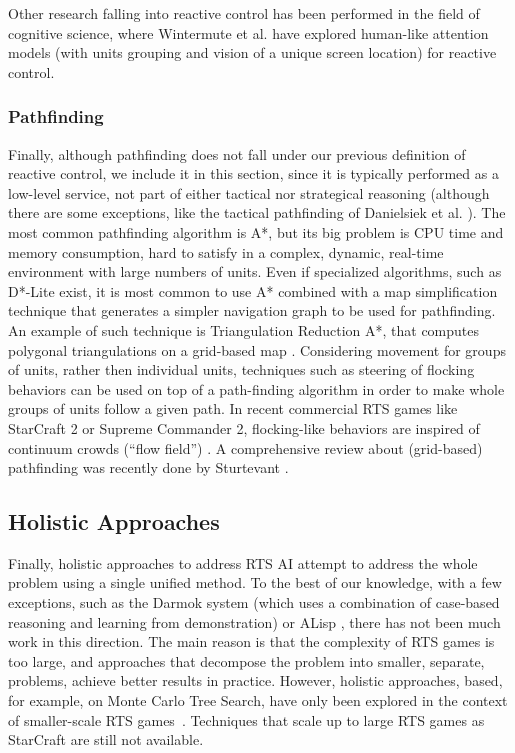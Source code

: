 \documentclass{llncs}
\begin{document}
Other research falling into reactive control has been performed in the
field of cognitive science, where  Wintermute et al. \cite{SORTS} have
explored human-like  attention models (with units  grouping and vision
of a unique screen location) for reactive control.

\subsubsection*{Pathfinding}
Finally,  although  pathfinding  does  not  fall  under  our  previous
definition of reactive  control, we include it in  this section, since
it is typically  performed as a low-level service, not  part of either
tactical   nor  strategical   reasoning  (although   there  are   some
exceptions,   like  the   tactical   pathfinding   of  Danielsiek   et
al. \cite{Danielsiek_2008}). The most  common pathfinding algorithm is
A*, but  its big problem is  CPU time and memory  consumption, hard to
satisfy  in  a  complex,  dynamic, real-time  environment  with  large
numbers  of units.  Even if  specialized algorithms,  such as  D*-Lite
\cite{KoenigL02} exist,  it is most common  to use A* combined  with a
map simplification technique that generates a simpler navigation graph
to  be  used  for  pathfinding.   An  example  of  such  technique  is
Triangulation Reduction A*, that  computes polygonal triangulations on
a grid-based  map \cite{Demyen_2006}. Considering movement  for groups
of units, rather then individual units, techniques such as steering of
flocking  behaviors  \cite{Reynolds_1999} can  be  used  on top  of  a
path-finding algorithm in order to make whole groups of units follow a
given path. In recent commercial RTS games like StarCraft 2 or Supreme
Commander 2, flocking-like behaviors  are inspired of continuum crowds
(``flow  field'') \cite{Treuille2006}.  A  comprehensive review  about
(grid-based)   pathfinding    was   recently   done    by   Sturtevant
\cite{sturtevant2012benchmarks}.

\subsection*{Holistic Approaches}

Finally, holistic approaches  to address  RTS AI attempt  to address  the whole
problem using a  single unified method. To the best  of our knowledge,
with a few  exceptions, such as the  Darmok system \cite{OntanonMSR10}
(which uses  a combination of  case-based reasoning and  learning from
demonstration) or ALisp \cite{Marthi05}, there  has not been much work
in this  direction.  The  main reason  is that  the complexity  of RTS
games is  too large,  and approaches that  decompose the  problem into
smaller,    separate,   problems,    achieve    better   results    in
practice. However,  holistic approaches, based, for  example, on Monte
Carlo  Tree  Search,  have  only  been  explored  in  the  context  of
smaller-scale RTS games~\cite{ontanon2013naive}. Techniques that scale
up to large RTS games as StarCraft are still not available.
\end{document}
